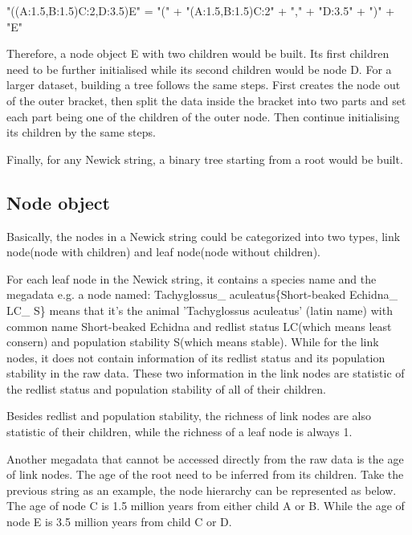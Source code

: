 \documentclass[MSc]{icldt}
\begin{document}
\begin{center}
	"((A:1.5,B:1.5)C:2,D:3.5)E" =  "(" + "(A:1.5,B:1.5)C:2" + "," + "D:3.5" + ")" + "E"
\end{center}

Therefore, a node object E with two children would be built. Its first children need to be further initialised while its second children would be node D. For a larger dataset, building a tree follows the same steps. First creates the node out of the outer bracket, then split the data inside the bracket into two parts and set each part being one of the children of the outer node. Then continue initialising its children by the same steps.

Finally, for any Newick string, a binary tree starting from a root would be built. 

\subsection{Node object}

Basically, the nodes in a Newick string could be categorized into two types, link node(node with children) and leaf node(node without children).

For each leaf node in the Newick string, it contains a species name and the megadata e.g. a node named: Tachyglossus\_ aculeatus\{Short-beaked Echidna\_ LC\_ S\} means that it's the animal 'Tachyglossus aculeatus' (latin name) with common name Short-beaked Echidna and redlist status LC(which means least consern) and population stability S(which means stable). While for the link nodes, it does not contain information of its redlist status and its population stability in the raw data. These two information in the link nodes are statistic of the redlist status and population stability of all of their children. 

Besides redlist and population stability, the richness of link nodes are also statistic of their children, while the richness of a leaf node is always 1. 

Another megadata that cannot be accessed directly from the raw data is the age of link nodes. The age of the root need to be inferred from its children. Take the previous string as an example, the node hierarchy can be represented as below. The age of node C is 1.5 million years from either child A or B. While the age of node E is 3.5 million years from child C or D.

\begin{center}
\end{center}
\end{document}
